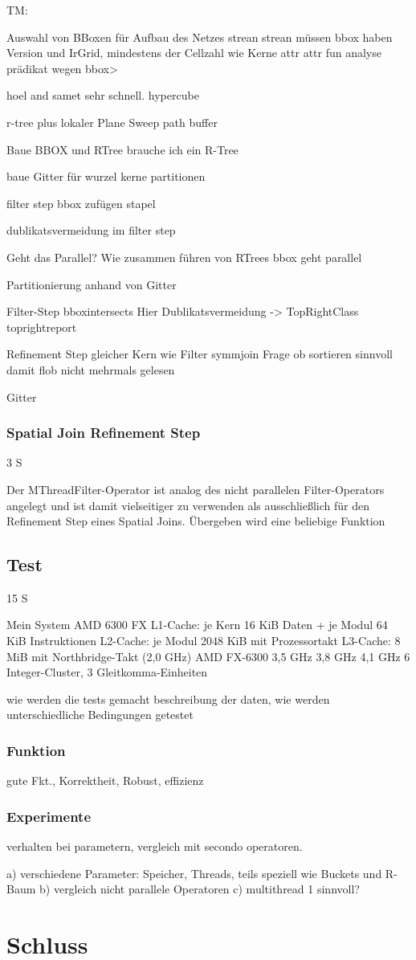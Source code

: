 \documentclass[a4paper,12pt,twoside]{article}
\begin{document}
TM:

Auswahl von BBoxen für Aufbau des Netzes
strean strean müssen bbox haben Version und IrGrid, mindestens der Cellzahl wie Kerne
attr attr fun
analyse prädikat wegen bbox>

hoel and samet sehr schnell. hypercube

r-tree plus lokaler Plane Sweep
path buffer


Baue BBOX und RTree
brauche ich ein R-Tree

baue Gitter für wurzel kerne partitionen

filter step bbox zufügen stapel

dublikatsvermeidung im filter step

Geht das Parallel? Wie zusammen führen von RTrees
bbox geht parallel

Partitionierung
anhand von Gitter

Filter-Step
bboxintersects
Hier Dublikatsvermeidung -> TopRightClass
toprightreport

Refinement Step gleicher Kern wie Filter
symmjoin
Frage ob sortieren sinnvoll damit flob nicht mehrmals gelesen

Gitter

\subsubsection{Spatial Join Refinement Step} 3 S

Der MThreadFilter-Operator ist analog des nicht parallelen Filter-Operators angelegt und ist damit vielseitiger zu verwenden als ausschließlich für den Refinement Step eines Spatial Joins. Übergeben wird eine beliebige Funktion

\subsection{Test} 15 S

Mein System AMD 6300 FX
L1-Cache: je Kern 16 KiB Daten + je Modul 64 KiB Instruktionen
L2-Cache: je Modul 2048 KiB mit Prozessortakt
L3-Cache: 8 MiB mit Northbridge-Takt (2,0 GHz)
AMD FX-6300 	3,5 GHz 	3,8 GHz 	4,1 GHz
6 Integer-Cluster, 3 Gleitkomma-Einheiten

wie werden die tests gemacht
beschreibung der daten, wie werden unterschiedliche Bedingungen getestet

\subsubsection{Funktion}
gute Fkt., Korrektheit, Robust, effizienz


\subsubsection{Experimente}
verhalten bei parametern, vergleich mit secondo operatoren.

a) verschiedene Parameter: Speicher, Threads, teils speziell wie Buckets und R-Baum 
b) vergleich nicht parallele Operatoren
c) multithread 1 sinnvoll?

\section{Schluss}

\pagebreak 
\printbibliography
\end{document}

